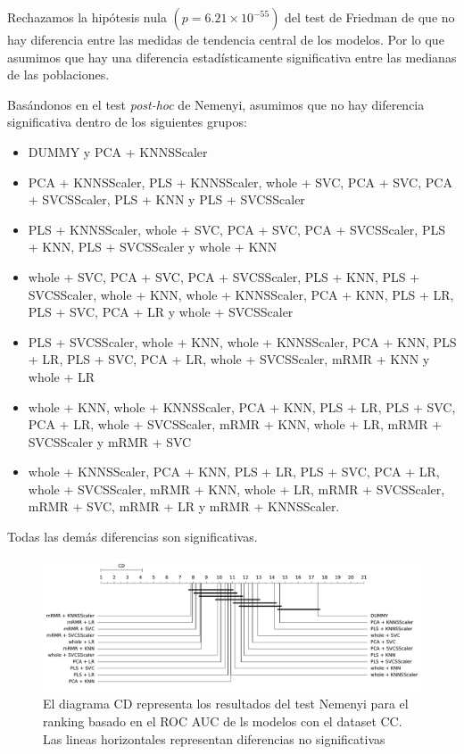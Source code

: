 \documentclass[a4paper,oneside,11pt,leqno]{article}
\begin{document}
	Rechazamos la hipótesis nula $(p=6.21\times 10^{-55})$ del test de Friedman de que no hay diferencia entre las medidas de tendencia central de los modelos. Por lo que asumimos que hay una diferencia estadísticamente significativa entre las medianas de las poblaciones. 
	
	Basándonos en el test \textit{post-hoc} de Nemenyi, asumimos que no hay diferencia significativa dentro de los siguientes grupos:
	
	\begin{itemize}
		\item DUMMY y PCA + KNNSScaler
		
		\item PCA + KNNSScaler, PLS + KNNSScaler, whole + SVC, PCA + SVC, PCA + SVCSScaler, PLS + KNN y PLS + SVCSScaler
		
		\item PLS + KNNSScaler, whole + SVC, PCA + SVC, PCA + SVCSScaler, PLS + KNN, PLS + SVCSScaler y whole + KNN
		
		\item whole + SVC, PCA + SVC, PCA + SVCSScaler, PLS + KNN, PLS + SVCSScaler, whole + KNN, whole + KNNSScaler, PCA + KNN, PLS + LR, PLS + SVC, PCA + LR y whole + SVCSScaler
		
		\item  PLS + SVCSScaler, whole + KNN, whole + KNNSScaler, PCA + KNN, PLS + LR, PLS + SVC, PCA + LR, whole + SVCSScaler, mRMR + KNN y whole + LR
		
		\item  whole + KNN, whole + KNNSScaler, PCA + KNN, PLS + LR, PLS + SVC, PCA + LR, whole + SVCSScaler, mRMR + KNN, whole + LR, mRMR + SVCSScaler y mRMR + SVC
		
		\item  whole + KNNSScaler, PCA + KNN, PLS + LR, PLS + SVC, PCA + LR, whole + SVCSScaler, mRMR + KNN, whole + LR, mRMR + SVCSScaler, mRMR + SVC, mRMR + LR y mRMR + KNNSScaler.
	\end{itemize}
	
	Todas las demás diferencias son significativas.
	 
	\begin{figure}[h]
		\includegraphics[width=\linewidth]{stat_results_cc.pdf}
		\caption{El diagrama CD representa los resultados del test Nemenyi para el ranking basado en el ROC AUC de ls modelos con el dataset CC. Las lineas horizontales representan diferencias no significativas}
		\label{fig:stats_fig_cc}
	\end{figure}
\end{document}
